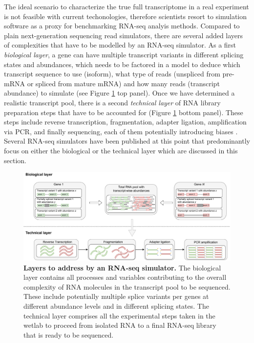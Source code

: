 The ideal scenario to characterize the true full transcriptome in a real experiment is not feasible with current techonologies, therefore scientists resort to simulation software as a proxy for benchmarking RNA-seq analyis methods. Compared to plain next-generation sequencing read simulators, there are several added layers of complexities that have to be modelled by an RNA-seq simulator. As a first \textit{biological layer}, a gene can have multiple transcript variants in different splicing states and abundances, which needs to be factored in a model to deduce which transcript sequence to use (isoform), what type of reads (unspliced from pre-mRNA or spliced from mature mRNA) and how many reads (transcript abundance) to simulate (see Figure \ref{fig:rnaseq_simulator_layers} top panel). Once we have determined a realistic transcript pool, there is a second \textit{technical layer} of RNA library preparation steps that have to be accounted for (Figure \ref{fig:rnaseq_simulator_layers} bottom panel). These steps include reverse transcription, fragmentation, adapter ligation, amplification via PCR, and finally sequencing, each of them potentially introducing biases \citep{Sendler2011,Hansen2010,Benjamini2012}. Several RNA-seq simulators have been published at this point that predominantly focus on either the biological or the technical layer which are discussed in this section.

\begin{figure}[h]
	 \centering
	 \includegraphics[width=1.0\linewidth]{img/chapter1/rnaseq_simulation-block_diagram}
	  \caption[Layers to address by an RNA-seq simulator]{\textbf{Layers to address by an RNA-seq simulator.} The biological layer contains all processes and variables contributing to the overall complexity of RNA molecules in the transcript pool to be sequenced. These include potentially multiple splice variants per genes at different abundance levels and in different splicing states. The technical layer comprises all the experimental steps taken in the wetlab to proceed from isolated RNA to a final RNA-seq library that is ready to be sequenced.}
	 \label{fig:rnaseq_simulator_layers}
\end{figure}

